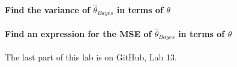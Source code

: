 \documentclass[]{article}
\let\oldparagraph\paragraph
\renewcommand{\paragraph}[1]{\oldparagraph{#1}\mbox{}}
\begin{document}
\vspace{3cm}

\paragraph{\texorpdfstring{Find the variance of \(\hat{\theta}_{Bayes}\)
in terms of
\(\theta\)}{Find the variance of \textbackslash{}hat\{\textbackslash{}theta\}\_\{Bayes\} in terms of \textbackslash{}theta}}\label{find-the-variance-of-hattheta_bayes-in-terms-of-theta}

\vspace{3cm}

\paragraph{\texorpdfstring{Find an expression for the MSE of
\(\hat{\theta}_{Bayes}\) in terms of
\(\theta\)}{Find an expression for the MSE of \textbackslash{}hat\{\textbackslash{}theta\}\_\{Bayes\} in terms of \textbackslash{}theta}}\label{find-an-expression-for-the-mse-of-hattheta_bayes-in-terms-of-theta}

\vspace{3cm}

The last part of this lab is on GitHub, Lab 13.
\end{document}
